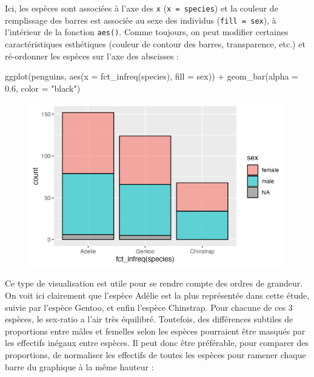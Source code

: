 \documentclass[
  letterpaper,
  DIV=11,
  numbers=noendperiod]{scrreprt}
\newenvironment{Shaded}{\begin{snugshade}}{\end{snugshade}}
\newcommand{\AttributeTok}[1]{\textcolor[rgb]{0.40,0.45,0.13}{#1}}
\newcommand{\FloatTok}[1]{\textcolor[rgb]{0.68,0.00,0.00}{#1}}
\newcommand{\FunctionTok}[1]{\textcolor[rgb]{0.28,0.35,0.67}{#1}}
\newcommand{\NormalTok}[1]{\textcolor[rgb]{0.00,0.23,0.31}{#1}}
\newcommand{\SpecialCharTok}[1]{\textcolor[rgb]{0.37,0.37,0.37}{#1}}
\newcommand{\StringTok}[1]{\textcolor[rgb]{0.13,0.47,0.30}{#1}}
\begin{document}
Ici, les espèces sont associées à l'axe des \texttt{x}
(\texttt{x\ =\ species}) et la couleur de remplissage des barres est
associée au sexe des individus (\texttt{fill\ =\ sex}), à l'intérieur de
la fonction \texttt{aes()}. Comme toujours, on peut modifier certaines
caractéristiques esthétiques (couleur de contour des barres,
transparence, etc.) et ré-ordonner les espèces sur l'axe des abscisses :

\begin{Shaded}
\begin{Highlighting}[]
\FunctionTok{ggplot}\NormalTok{(penguins, }\FunctionTok{aes}\NormalTok{(}\AttributeTok{x =} \FunctionTok{fct\_infreq}\NormalTok{(species), }\AttributeTok{fill =}\NormalTok{ sex)) }\SpecialCharTok{+}
  \FunctionTok{geom\_bar}\NormalTok{(}\AttributeTok{alpha =} \FloatTok{0.6}\NormalTok{, }\AttributeTok{color =} \StringTok{"black"}\NormalTok{)}
\end{Highlighting}
\end{Shaded}

\begin{figure}[H]

{\centering \includegraphics{./03-visualization_files/figure-pdf/unnamed-chunk-55-1.png}

}

\end{figure}

Ce type de visualisation est utile pour se rendre compte des ordres de
grandeur. On voit ici clairement que l'espèce Adélie est la plus
représentée dans cette étude, suivie par l'espèce Gentoo, et enfin
l'espèce Chinstrap. Pour chacune de ces 3 espèces, le sex-ratio a l'air
très équilibré. Toutefois, des différences subtiles de proportions entre
mâles et femelles selon les espèces pourraient être masqués par les
effectifs inégaux entre espèces. Il peut donc être préférable, pour
comparer des proportions, de normaliser les effectifs de toutes les
espèces pour ramener chaque barre du graphique à la même hauteur :
\end{document}
